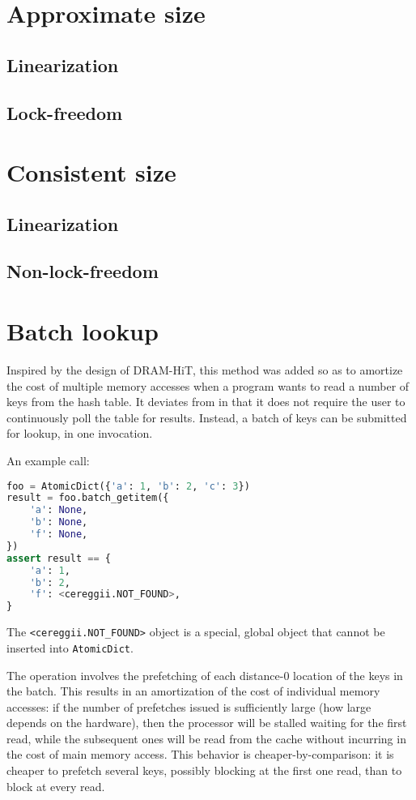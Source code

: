 \section{Approximate size}
\subsection{Linearization}
\subsection{Lock-freedom}

\section{Consistent size}
\subsection{Linearization}
\subsection{Non-lock-freedom}

\section{Batch lookup}

Inspired by the design of DRAM-HiT, this method was added so as to amortize the cost of multiple memory accesses when a program wants to read a number of keys from the hash table.
It deviates from \cite{dramhit} in that it does not require the user to continuously poll the table for results.
Instead, a batch of keys can be submitted for lookup, in one invocation.

An example call:

\begin{lstlisting}[language=Python]
foo = AtomicDict({'a': 1, 'b': 2, 'c': 3})
result = foo.batch_getitem({
	'a': None,
	'b': None,
	'f': None,
})
assert result == {
	'a': 1,
	'b': 2,
	'f': <cereggii.NOT_FOUND>,
}
\end{lstlisting}

The \texttt{<cereggii.NOT\_FOUND>} object is a special, global object that cannot be inserted into \texttt{AtomicDict}.

The operation involves the prefetching of each distance-0 location of the keys in the batch.
This results in an amortization of the cost of individual memory accesses: if the number of prefetches issued is sufficiently large (how large depends on the hardware), then the processor will be stalled waiting for the first read, while the subsequent ones will be read from the cache without incurring in the cost of main memory access.
This behavior is cheaper-by-comparison: it is cheaper to prefetch several keys, possibly blocking at the first one read, than to block at every read.

